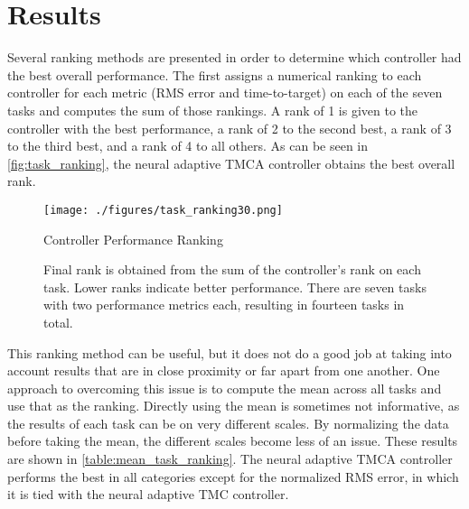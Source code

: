 \documentclass[letterpaper,12pt,titlepage,oneside,final]{book}
\begin{document}
\section{Results}


Several ranking methods are presented in order to determine which controller had the best overall performance.
The first assigns a numerical ranking to each controller for each metric (RMS error and time-to-target) on each of the seven tasks and computes the sum of those rankings.
A rank of 1 is given to the controller with the best performance, a rank of 2 to the second best, a rank of 3 to the third best, and a rank of 4 to all others.
As can be seen in \autoref{fig:task_ranking}, the neural adaptive TMCA controller obtains the best overall rank.

\begin{figure}
\centering
\texttt{[image: ./figures/task\_ranking30.png]}

\caption{Controller Performance Ranking}
\label{fig:task_ranking}
\captionsetup{singlelinecheck=off,font=footnotesize}
\caption*{Final rank is obtained from the sum of the controller's rank on each task. Lower ranks indicate better performance. There are seven tasks with two performance metrics each, resulting in fourteen tasks in total.}
\end{figure}

This ranking method can be useful, but it does not do a good job at taking into account results that are in close proximity or far apart from one another.
One approach to overcoming this issue is to compute the mean across all tasks and use that as the ranking.
Directly using the mean is sometimes not informative, as the results of each task can be on very different scales.
By normalizing the data before taking the mean, the different scales become less of an issue.
These results are shown in \autoref{table:mean_task_ranking}.
The neural adaptive TMCA controller performs the best in all categories except for the normalized RMS error, in which it is tied with the neural adaptive TMC controller.
\end{document}
